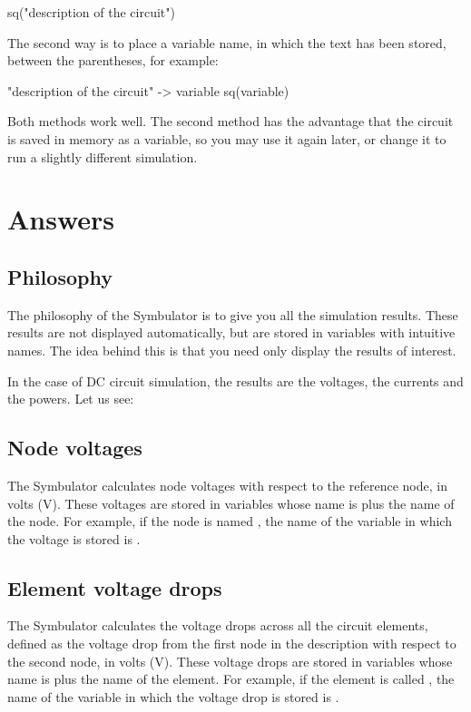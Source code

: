 \begin{entry}
sq\dc("description of the circuit")
\end{entry}

The second way is to place a variable name, in which the text has
been stored, between the parentheses, for example:

\begin{entry}
"description of the circuit" -> variable
sq\dc(variable)
\end{entry}

Both methods work well. The second method has the advantage that the
circuit is saved in memory as a variable, so you may use it again
later, or change it to run a slightly different simulation.

\section{Answers}

\subsection{Philosophy}

The philosophy of the Symbulator is to give you all the simulation
results. These results are not displayed automatically, but are
stored in variables with intuitive names. The idea behind this is
that you need only display the results of interest.

In the case of DC circuit simulation, the results are the voltages,
the currents and the powers. Let us see:

\subsection{Node voltages}

The Symbulator calculates node voltages with respect to the
reference node, in volts (V). These voltages are stored in variables
whose name is  plus the name of the node. For example, if
the node is named , the name of the variable in which the
voltage is stored is .

\subsection{Element voltage drops}

The Symbulator calculates the voltage drops across all the circuit
elements, defined as the voltage drop from the first node in the
description with respect to the second node, in volts (V). These
voltage drops are stored in variables whose name is  plus
the name of the element. For example, if the element is called
, the name of the variable in which the voltage drop is
stored is .

